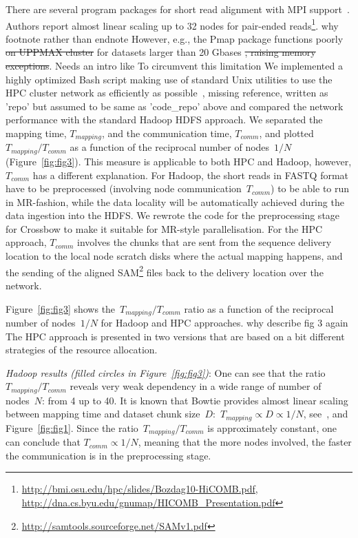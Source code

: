 \documentclass[11pt, oneside]{article}   	%
\newcommand{\COMMENT}[1]{{\color{red} #1 }}
\begin{document}
There are several program packages for short read alignment with MPI support~\cite{pmap, gnumap}. Authors report almost linear scaling up to 32 nodes for pair-ended reads\footnote{\url{http://bmi.osu.edu/hpc/slides/Bozdag10-HiCOMB.pdf}, \url{http://dna.cs.byu.edu/gnumap/HICOMB_Presentation.pdf}}. \COMMENT{why footnote rather than endnote} However, e.g., the Pmap package functions poorly \sout{on UPPMAX cluster} for datasets larger than 20 Gbases \sout{, raising memory exceptions}. \COMMENT{Needs an intro like To circumvent this limitation} We implemented a highly optimized Bash script making use of standard Unix utilities to use the HPC cluster network as efficiently as possible~\cite{code_repo}, \COMMENT{missing reference, written as 'repo' but assumed to be same as 'code\_repo' above} and compared the network performance with the standard Hadoop HDFS approach. We separated the mapping time, $T_{mapping}$, and the communication time, $T_{comm}$, and plotted $T_{mapping}/T_{comm}$ as a function of the reciprocal number of nodes~$1/N$ (Figure~\ref{fig:fig3}). 
This measure is applicable to both HPC and Hadoop, however, $T_{comm}$ has a different explanation. For Hadoop, the short reads in FASTQ format have to be preprocessed (involving node communication~$T_{comm}$) to be able to run in MR-fashion, while the data locality will be automatically achieved during the data ingestion into the HDFS. 
We rewrote the code for the preprocessing stage for Crossbow to make it suitable for MR-style parallelisation.
For the HPC approach, $T_{comm}$ involves the chunks that are sent from the sequence delivery location to the local node scratch disks where the actual mapping happens, and the sending of the aligned SAM\footnote{\url{http://samtools.sourceforge.net/SAMv1.pdf}} files back to the delivery location over the network.

Figure~\ref{fig:fig3} shows the~$T_{mapping}/T_{comm}$ ratio as a function of the reciprocal number of nodes~$1/N$ for Hadoop and HPC approaches. \COMMENT{why describe fig 3 again} The HPC approach is presented in two versions that are based on a bit different strategies of the resource allocation.  

\textit{Hadoop results (filled circles in Figure~\ref{fig:fig3})}: One can see that the ratio~$T_{mapping}/T_{comm}$ reveals very weak dependency in a wide range of number of nodes~$N$: from 4 up to 40. It is known that Bowtie provides almost linear scaling between mapping time and dataset chunk size~$D$:~$T_{mapping}\propto  D\propto 1/N$, see~\cite{bowtie}, and Figure~\ref{fig:fig1}. Since the ratio~$T_{mapping}/T_{comm}$ is approximately constant, one can conclude that $T_{comm}\propto 1/N$, meaning that the more nodes involved, the faster the communication is in the preprocessing stage.
\end{document}
